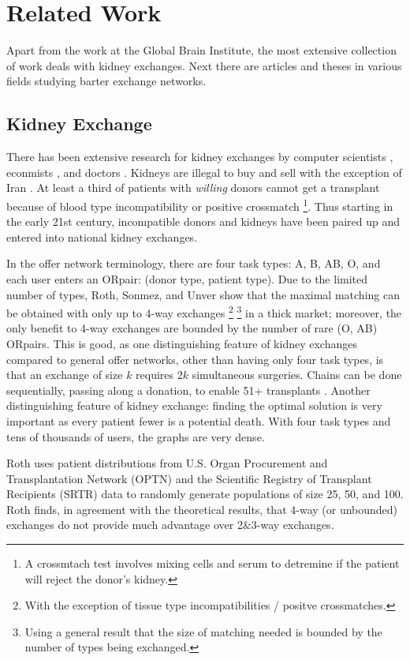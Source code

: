 \documentclass[main.tex]{subfiles}
\begin{document}
\section{Related Work}
Apart from the work at the Global Brain Institute, the most extensive collection of work deals with kidney exchanges. Next there are articles and theses in various fields studying barter exchange networks.

\subsection{Kidney Exchange}
There has been extensive research for kidney exchanges by computer scientists \cite{Bir}\cite{Abr1}, econmists \cite{Rot1}\cite{Rot2}, and doctors \cite{Seg1}. Kidneys are illegal to buy and sell with the exception of Iran \cite{Rot3}. At least a third of patients with \textit{willing} donors cannot get a transplant because of blood type incompatibility or positive crossmatch \cite{Seg1} \footnote{A crossmtach test involves mixing cells and serum to detremine if the patient will reject the donor's kidney.}. Thus starting in the early 21st century, incompatible donors and kidneys have been paired up and entered into national kidney exchanges.

In the offer network terminology, there are four task types: A, B, AB, O, and each user enters an ORpair: (donor type, patient type). Due to the limited number of types, Roth, Sonmez, and Unver \cite{Rot2} show that the maximal matching can be obtained with only up to 4-way exchanges \footnote{With the exception of tissue type incompatibilities / positve crossmatches.} \footnote{Using a general result that the size of matching needed is bounded by the number of types being exchanged.} in a thick market; moreover, the only benefit to 4-way exchanges are bounded by the number of rare (O, AB) ORpairs. This is good, as one distinguishing feature of kidney exchanges compared to general offer networks, other than having only four task types, is that an exchange of size $k$ requires $2k$ simultaneous surgeries. Chains can be done sequentially, passing along a donation, to enable 51+ transplants \cite{art:uab}. Another distinguishing feature of kidney exchange: finding the optimal solution is very important as every patient fewer is a potential death. With four task types and tens of thousands of users, the graphs are very dense.

Roth \cite{Rot2} uses patient distributions from U.S. Organ Procurement and Transplantation Network (OPTN) and the Scientific Registry of Transplant Recipients (SRTR) data to randomly generate populations of size 25, 50, and 100. Roth finds, in agreement with the theoretical results, that 4-way (or unbounded) exchanges do not provide much advantage over 2\&3-way exchanges.
\end{document}
